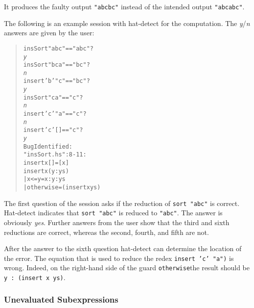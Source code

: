 \documentclass[12pt]{article}
\begin{document}
It produces the faulty output \texttt{"abcbc"} instead of the intended
output \texttt{"abcabc"}.

The following is an example session with hat-detect for the
computation. The \emph{y}/\emph{n} answers are given by the user:

\begin{quote}
\begin{alltt}
insSort "abc" == "abc"?
\emph{y}
insSort "bca" == "bc"?
\emph{n}
insert 'b' "c" == "bc"?
\emph{y}
insSort "ca" == "c"?
\emph{n}
insert 'c' "a" == "c"?
\emph{n}
insert 'c' [] == "c"?
\emph{y}
Bug Identified:
  "insSort.hs":8-11:
  insert x [] = [x]
  insert x (y:ys)
    | x <= y    = x:y:ys
    | otherwise = (insert x ys)
\end{alltt}
\end{quote}

The first question of the session asks if the reduction of \texttt{sort "abc"}
is correct. Hat-detect indicates that \texttt{sort "abc"} is reduced to
\texttt{"abc"}. The answer is obviously \emph{yes}.  Further answers from the
user show that the third and sixth reductions are correct, whereas the second,
fourth, and fifth are not.

After the answer to the sixth question hat-detect can determine
the location of the error.  The equation that is used to reduce
the redex \texttt{insert 'c' "a")} is wrong. Indeed, on the right-hand
side of the guard \texttt{otherwise}the result
should be \texttt{y~:~(insert~x~ys)}.



\subsubsection{Unevaluated Subexpressions}
\end{document}
